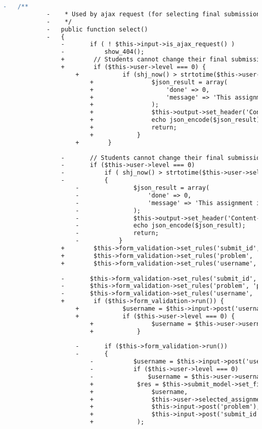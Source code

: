 \begin{lstlisting}[language=diff, caption=Perubahan pada kode Submissions.php]
			-	/**
			-	 * Used by ajax request (for selecting final submission)
			-	 */
			-	public function select()
			-	{
				-		if ( ! $this->input->is_ajax_request() )
				-			show_404();
				+        // Students cannot change their final submission after finish_time + extra_time
				+        if ($this->user->level === 0) {
					+            if (shj_now() > strtotime($this->user->selected_assignment['finish_time']) + $this->user->selected_assignment['extra_time']) {
						+                $json_result = array(
						+                    'done' => 0,
						+                    'message' => 'This assignment is finished. You cannot change your final submissions.'
						+                );
						+                $this->output->set_header('Content-Type: application/json; charset=utf-8');
						+                echo json_encode($json_result);
						+                return;
						+            }
					+        }
				
				-		// Students cannot change their final submission after finish_time + extra_time
				-		if ($this->user->level === 0)
				-			if ( shj_now() > strtotime($this->user->selected_assignment['finish_time'])+$this->user->selected_assignment['extra_time'])
				-			{
					-				$json_result = array(
					-					'done' => 0,
					-					'message' => 'This assignment is finished. You cannot change your final submissions.'
					-				);
					-				$this->output->set_header('Content-Type: application/json; charset=utf-8');
					-				echo json_encode($json_result);
					-				return;
					-			}
				+        $this->form_validation->set_rules('submit_id', 'Submit ID', 'integer|greater_than[0]');
				+        $this->form_validation->set_rules('problem', 'problem', 'integer|greater_than[0]');
				+        $this->form_validation->set_rules('username', 'Username', 'required|min_length[3]|max_length[20]|alpha_numeric');
				
				-		$this->form_validation->set_rules('submit_id', 'Submit ID', 'integer|greater_than[0]');
				-		$this->form_validation->set_rules('problem', 'problem', 'integer|greater_than[0]');
				-		$this->form_validation->set_rules('username', 'Username', 'required|min_length[3]|max_length[20]|alpha_numeric');
				+        if ($this->form_validation->run()) {
					+            $username = $this->input->post('username');
					+            if ($this->user->level === 0) {
						+                $username = $this->user->username;
						+            }
					
					-		if ($this->form_validation->run())
					-		{
						-			$username = $this->input->post('username');
						-			if ($this->user->level === 0)
						-				$username = $this->user->username;
						+            $res = $this->submit_model->set_final_submission(
						+                $username,
						+                $this->user->selected_assignment['id'],
						+                $this->input->post('problem'),
						+                $this->input->post('submit_id')
						+            );
						

\end{lstlisting}
